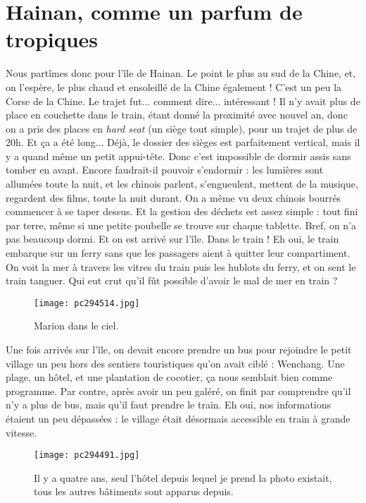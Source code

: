\documentclass{book}
\begin{document}
\chapter{Hainan, comme un parfum de tropiques}
Nous partîmes donc pour l'île de Hainan. Le point le plus au sud de la Chine, et, on l'espère, le plus chaud et ensoleillé de la Chine également ! C'est un peu la Corse de la Chine. Le trajet fut... comment dire... intéressant ! Il n'y avait plus de place en couchette dans le train, étant donné la proximité avec nouvel an, donc on a pris des places en \emph{hard seat} (un siège tout simple), pour un trajet de plus de 20h. Et ça a été long... Déjà, le dossier des sièges est parfaitement vertical, mais il y a quand même un petit appui-tête. Donc c'est impossible de dormir assis sans tomber en avant. Encore faudrait-il pouvoir s'endormir : les lumières sont allumées toute la nuit, et les chinois parlent, s'engueulent, mettent de la musique, regardent des films, toute la nuit durant. On a même vu deux chinois bourrés commencer à se taper dessus. Et la gestion des déchets est assez simple : tout fini par terre, même si une petite poubelle se trouve sur chaque tablette. Bref, on n'a pas beaucoup dormi. Et on est arrivé sur l'île. Dans le train ! Eh oui, le train embarque sur un ferry sans que les passagers aient à quitter leur compartiment. On voit la mer à travers les vitres du train puis les hublots du ferry, et on sent le train tanguer. Qui eut crut qu'il fût possible d'avoir le mal de mer en train ?


\begin{figure}[h]
\centering
\texttt{[image: pc294514.jpg]}
\caption*{Marion dans le ciel.}
\end{figure}


Une fois arrivés sur l'île, on devait encore prendre un bus pour rejoindre le petit village un peu hors des sentiers touristiques qu'on avait ciblé : Wenchang. Une plage, un hôtel, et une plantation de cocotier, ça nous semblait bien comme programme. Par contre, après avoir un peu galéré, on finit par comprendre qu'il n'y a plus de bus, mais qu'il faut prendre le train. Eh oui, nos informations étaient un peu dépassées : le village était désormais accessible en train à grande vitesse.


\begin{figure}[h]
\centering
\texttt{[image: pc294491.jpg]}
\caption*{Il y a quatre ans, seul l'hôtel depuis lequel je prend la photo existait, tous les autres bâtiments sont apparus depuis.}
\end{figure}
\end{document}
